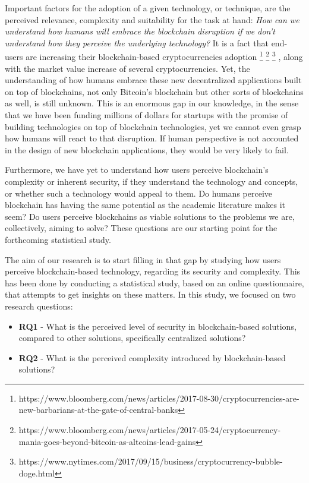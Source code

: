 Important factors for the adoption of a given technology, or technique, are the perceived relevance, complexity and suitability for the task at hand: \emph{How can we understand how humans will embrace the blockchain disruption if we don't understand how they perceive the underlying technology?} It is a fact that end-users are increasing their blockchain-based cryptocurrencies adoption \footnote{https://www.bloomberg.com/news/articles/2017-08-30/cryptocurrencies-are-new-barbarians-at-the-gate-of-central-banks} \footnote{https://www.bloomberg.com/news/articles/2017-05-24/cryptocurrency-mania-goes-beyond-bitcoin-as-altcoins-lead-gains} \footnote{https://www.nytimes.com/2017/09/15/business/cryptocurrency-bubble-doge.html} , along with the market value increase of several cryptocurrencies. Yet, the understanding of how humans embrace these new decentralized applications built on top of blockchains, not only Bitcoin's blockchain but other sorts of blockchains as well, is still unknown. This is an enormous gap in our knowledge, in the sense that we have been funding millions of dollars for startups with the promise of building technologies on top of blockchain technologies, yet we cannot even grasp how humans will react to that disruption. If human perspective is not accounted in the design of new blockchain applications, they would be very likely to fail.

Furthermore, we have yet to understand how users perceive blockchain's complexity or inherent security, if they understand the technology and concepts, or whether such a technology would appeal to them. Do humans perceive blockchain has having the same potential as the academic literature makes it seem? Do users perceive blockchains as viable solutions to the problems we are, collectively, aiming to solve? These questions are our starting point for the forthcoming statistical study.

The aim of our research is to start filling in that gap by studying how users perceive blockchain-based technology, regarding its security and complexity. This has been done by conducting a statistical study, based on an online questionnaire, that attempts to get insights on these matters. In this study, we focused on two research questions:
  
\begin{itemize}
    \item \textbf{RQ1} - What is the perceived level of security in blockchain-based solutions, compared to other solutions, specifically centralized solutions?
    \item \textbf{RQ2} - What is the perceived complexity introduced by blockchain-based solutions?
\end{itemize}

